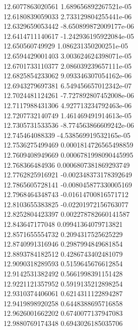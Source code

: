 {12.6077863020561 1.689656892267521e-05 \\
12.6180839059033 2.733129804255441e-06 \\
12.6329659053442 -8.650899872009177e-06 \\
12.6414711140617 -1.242936195922084e-05 \\
12.650560749929 1.086231350200251e-05 \\
12.6594429001403 3.003624624398071e-05 \\
12.6701733110377 2.086039239657111e-05 \\
12.6825854233062 9.093346307054162e-06 \\
12.6943279697381 6.549456657012342e-07 \\
12.7024481124261 -7.727892807452008e-06 \\
12.7117988431306 4.927713234792463e-06 \\
12.7207732140749 1.461469491914613e-05 \\
12.7305731533536 -8.774563866609242e-06 \\
12.745464088339 -4.538569919532165e-05 \\
12.7536275499469 0.0001814726565498859 \\
12.7609408949669 0.0006781998090445995 \\
12.768366484936 0.0006807381869293749 \\
12.7762825916921 -0.002348373178392649 \\
12.7865605728141 -0.008045877330005169 \\
12.7968464348743 -0.01614700816571712 \\
12.8103655383825 -0.02201972156763077 \\
12.8252804423397 0.002278782660141587 \\
12.843647177048 0.09941364079713821 \\
12.8571655554732 0.2094317525625229 \\
12.8740991316946 0.2987994849681854 \\
12.8893784182512 0.4286743402481079 \\
12.9090318289593 0.5159645676612854 \\
12.9142531382492 0.5661998391151428 \\
12.9221121357952 0.5919135212898254 \\
12.9310374406061 0.6214311122894287 \\
12.9419898920258 0.6448388695716858 \\
12.9626001662202 0.6740077137947083 \\
12.9880769174348 0.6943026185035706 \\
}
